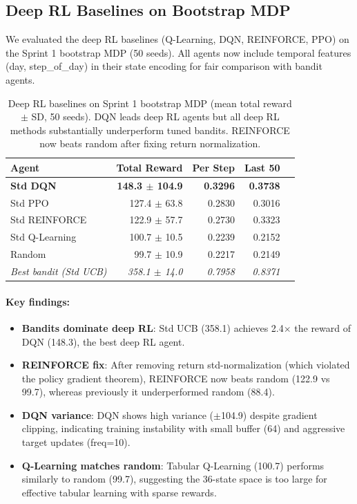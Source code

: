 \documentclass[11pt]{article}
\begin{document}
\subsection{Deep RL Baselines on Bootstrap MDP}

We evaluated the deep RL baselines (Q-Learning, DQN, REINFORCE, PPO) on the Sprint 1 bootstrap MDP (50 seeds). All agents now include temporal features (day, step\_of\_day) in their state encoding for fair comparison with bandit agents.

\begin{table}[h]
\centering
\begin{tabular}{lrrrr}
\toprule
Agent & Total Reward & Per Step & Last 50 \\
\midrule
\textbf{Std DQN} & \textbf{148.3 $\pm$ 104.9} & \textbf{0.3296} & \textbf{0.3738} \\
Std PPO & 127.4 $\pm$ 63.8 & 0.2830 & 0.3016 \\
Std REINFORCE & 122.9 $\pm$ 57.7 & 0.2730 & 0.3323 \\
Std Q-Learning & 100.7 $\pm$ 10.5 & 0.2239 & 0.2152 \\
Random & 99.7 $\pm$ 10.9 & 0.2217 & 0.2149 \\
\midrule
\textit{Best bandit (Std UCB)} & \textit{358.1 $\pm$ 14.0} & \textit{0.7958} & \textit{0.8371} \\
\bottomrule
\end{tabular}
\caption{Deep RL baselines on Sprint 1 bootstrap MDP (mean total reward $\pm$ SD, 50 seeds). DQN leads deep RL agents but all deep RL methods substantially underperform tuned bandits. REINFORCE now beats random after fixing return normalization.}
\end{table}

\paragraph{Key findings:}
\begin{itemize}
\item \textbf{Bandits dominate deep RL}: Std UCB (358.1) achieves 2.4$\times$ the reward of DQN (148.3), the best deep RL agent.
\item \textbf{REINFORCE fix}: After removing return std-normalization (which violated the policy gradient theorem), REINFORCE now beats random (122.9 vs 99.7), whereas previously it underperformed random (88.4).
\item \textbf{DQN variance}: DQN shows high variance ($\pm$104.9) despite gradient clipping, indicating training instability with small buffer (64) and aggressive target updates (freq=10).
\item \textbf{Q-Learning matches random}: Tabular Q-Learning (100.7) performs similarly to random (99.7), suggesting the 36-state space is too large for effective tabular learning with sparse rewards.
\end{itemize}
\end{document}
